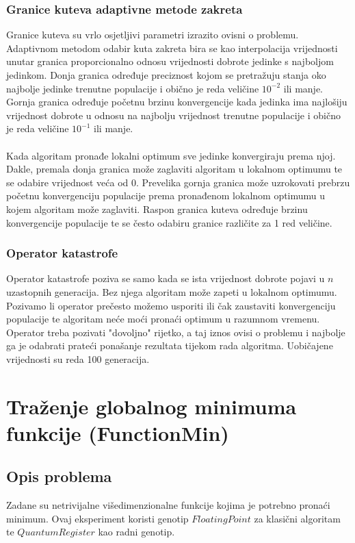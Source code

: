 \documentclass[times, utf8, zavrsni, numeric]{fer}
\begin{document}
\subsubsection{Granice kuteva adaptivne metode zakreta}
Granice kuteva su vrlo osjetljivi parametri izrazito ovisni o problemu. Adaptivnom metodom odabir kuta zakreta bira se kao interpolacija vrijednosti unutar granica proporcionalno odnosu vrijednosti dobrote jedinke s najboljom jedinkom. Donja granica određuje preciznost kojom se pretražuju stanja oko najbolje jedinke trenutne populacije i obično je reda veličine $10^{-2}$ ili manje.  Gornja granica određuje početnu brzinu konvergencije kada jedinka ima najlošiju vrijednost dobrote u odnosu na najbolju vrijednost trenutne populacije i obično je reda veličine $10^{-1}$ ili manje. 

\paragraph{}
Kada algoritam pronađe lokalni optimum sve jedinke konvergiraju prema njoj. Dakle, premala donja granica može zaglaviti algoritam u lokalnom optimumu te se odabire vrijednost veća od 0. Prevelika gornja granica može uzrokovati prebrzu početnu konvergenciju populacije prema pronađenom lokalnom optimumu u kojem algoritam može zaglaviti. Raspon granica kuteva određuje brzinu konvergencije populacije te se često odabiru granice različite za 1 red veličine.

\subsubsection{Operator katastrofe}
Operator katastrofe poziva se samo kada se ista vrijednost dobrote pojavi u $n$ uzastopnih generacija. Bez njega algoritam može zapeti u lokalnom optimumu. Pozivamo li operator prečesto možemo usporiti ili čak zaustaviti konvergenciju populacije te algoritam neće moći pronaći optimum u razumnom vremenu. Operator treba pozivati "dovoljno" rijetko, a taj iznos ovisi o problemu i najbolje ga je odabrati prateći ponašanje rezultata tijekom rada algoritma. Uobičajene vrijednosti su reda 100 generacija.

\clearpage

\section{Traženje globalnog minimuma funkcije (FunctionMin)}
\subsection{Opis problema}
Zadane su netrivijalne višedimenzionalne funkcije kojima je potrebno pronaći minimum.
Ovaj eksperiment koristi genotip $FloatingPoint$ za klasični algoritam te $QuantumRegister$ kao radni genotip.
\end{document}
